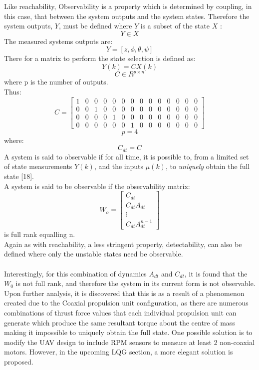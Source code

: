 \documentclass[12pt,a4paper,twoside]{report}
\begin{document}
				Like reachability, Observability is a property which is determined by coupling, in this case, that between the system outputs and the system states. Therefore the system outputs, $Y$, must be defined where $Y$ is a subset of the state $X$ :
				\[
					Y \in X
				\]
				The measured systems outputs are:
				\begin{equation}
					Y = [z,\phi,\theta,\psi]
				\end{equation}
				There for a matrix to perform the state selection is defined as:
				\\
				\begin{equation}
					Y(k) = CX(k)  
				\end{equation}
				\[
					C \in R^{p \times n}  
				\]
				where p is the number of outputs.
				\\
				Thus:
				\setcounter{MaxMatrixCols}{15}
				\begin{equation}
					C =
					\begin{bmatrix}
						1&0&0&0&0&0&0&0&0&0&0&0&0&0 \\
						0&0&1&0&0&0&0&0&0&0&0&0&0&0 \\
						0&0&0&0&1&0&0&0&0&0&0&0&0&0 \\
						0&0&0&0&0&0&1&0&0&0&0&0&0&0
					\end{bmatrix}  
				\end{equation}
				\[
				p = 4  
				\]
				where:
				\[
					C_{dt} = C
				\]
				A system is said to observable if for all time, it is possible to, from a limited set of state measurements $Y(k)$, and the inputs $\mu(k)$, to \emph{uniquely} obtain the full state [18].
				\\
				A system is said to be observable if the observability matrix:
				\begin{equation}
					W_o = 
					\begin{bmatrix}
					C_{dt}\\
					C_{dt}A_{dt}\\ 
					\vdots \\
					C_{dt}A_{dt}^{n-1}
					\end{bmatrix}
				\end{equation}
				is full rank equalling n.
				\\
				Again as with reachability, a less stringent property, detectability, can also be defined where only the unstable states need be observable.
				\\ \\
				Interestingly, for this combination of dynamics $A_{dt}$ and $C_{dt}$, it is found that the $W_0$ is not full rank, and therefore the system in its current form is not observable. Upon further analysis, it is discovered that this is as a result of a phenomenon created due to the Coaxial propulsion unit configuration, as there are numerous combinations of thrust force values that each individual propulsion unit can generate which produce the same resultant torque about the centre of mass making it impossible to uniquely obtain the full state. One possible solution is to modify the UAV design to include RPM sensors to measure at least 2 non-coaxial motors. However, in the upcoming LQG section, a more elegant solution is proposed.
		
\end{document}
